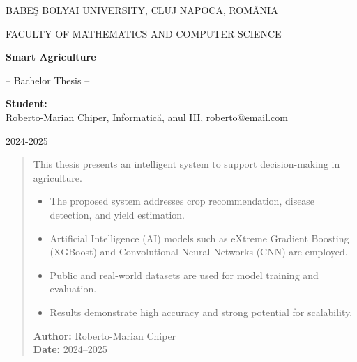 \documentclass[runningheads,a4paper,11pt,twoside]{report}
\begin{document}
\begin{titlepage}
\sloppy
\begin{center}
BABE\c{S} BOLYAI UNIVERSITY, CLUJ NAPOCA, ROM\^ANIA

FACULTY OF MATHEMATICS AND COMPUTER SCIENCE

\vspace{6cm}

\Huge \textbf{Smart Agriculture}

\vspace{1cm}

\normalsize -- Bachelor Thesis --
\end{center}

\vspace{5cm}

\begin{flushright}
\Large{\textbf{Student:}} \\
Roberto-Marian Chiper, Informatic\u{a}, anul III, roberto@email.com
\end{flushright}

\vspace{4cm}

\begin{center}
2024-2025
\end{center}
\end{titlepage}


\begin{abstract}
This thesis presents an intelligent system to support decision-making in agriculture.
\begin{itemize}
  \item The proposed system addresses crop recommendation, disease detection, and yield estimation.
  \item Artificial Intelligence (AI) models such as eXtreme Gradient Boosting (XGBoost) and Convolutional Neural Networks (CNN) are employed.
  \item Public and real-world datasets are used for model training and evaluation.
  \item Results demonstrate high accuracy and strong potential for scalability.
\end{itemize}

\noindent\textbf{Author:} Roberto-Marian Chiper \\
\textbf{Date:} 2024–2025
\end{abstract}

\tableofcontents
\listoftables
\listoffigures
\listofalgorithms
\end{document}
